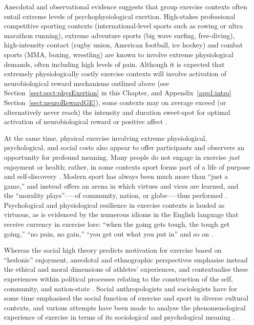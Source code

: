 \begin{CJK}{UTF8}{gbsn}
Anecdotal and observational evidence suggests that group exercise contexts often entail extreme levels of psychophysiological exertion.  High-stakes professional competitive sporting contexts (international-level sports such as rowing or ultra marathon running), extreme adventure sports (big wave surfing, free-diving), high-intensity contact (rugby union, American football, ice hockey) and combat sports (MMA, boxing, wrestling) are known to involve extreme physiological demands, often including high levels of pain.  Although it is expected that extremely physiologically costly exercise contexts will involve activation of neurobiological reward mechanisms outlined above (see Section~\ref{sect:sect:physExertion} in this Chapter, and Appendix~\ref{app1:intro} Section~\ref{sect:neuroRewardGE}), some contexts may on average exceed (or alternatively never reach) the intensity and duration sweet-spot for optimal activation of neurobiological reward \citep{Raichlen2013} or positive affect \citep{Ekkekakis2011,Reed2006}.

At the same time, physical exercise involving extreme physiological, psychological, and social costs also appear to offer participants and observers an opportunity for profound meaning.  Many people do not engage in exercise \textit{just} enjoyment or health; rather, in some contexts sport forms part of a life of purpose and self-discovery \citep[see, for example][]{Jackson1995,Jones2004,White2011}.  Modern sport has always been much more than ``just a game,'' and instead offers an arena in which virtues and vices are learned, and the ``morality plays''—--of community, nation, or globe—--thus performed \citep{Elias1986,McNamee2008}.  Psychological and physiological resilience in exercise contexts is lauded as virtuous, as is evidenced by the numerous idioms in the English language that receive currency in exercise lore: ``when the going gets tough, the tough get going,'' ``no pain, no gain,'' ``you get out what you put in'' and so on \citep{Sarkar2014}.

Whereas the social high theory predicts motivation for exercise based on ``hedonic'' enjoyment, anecdotal and ethnographic perspectives emphasise instead the ethical and moral dimensions of athletes' experiences, and contextualise these experiences within political processes relating to the construction of the self, community, and nation-state \citep{Alter1993,Brownell1995,Downey2005,Wacquant2004}.
Social anthropologists and sociologists have for some time emphasised the social function of exercise and sport in diverse cultural contexts, and various attempts have been made to analyse the phenomenological experience of exercise in terms of its sociological and psychological meaning \citep{Bourdieu1978}.


\end{CJK}
